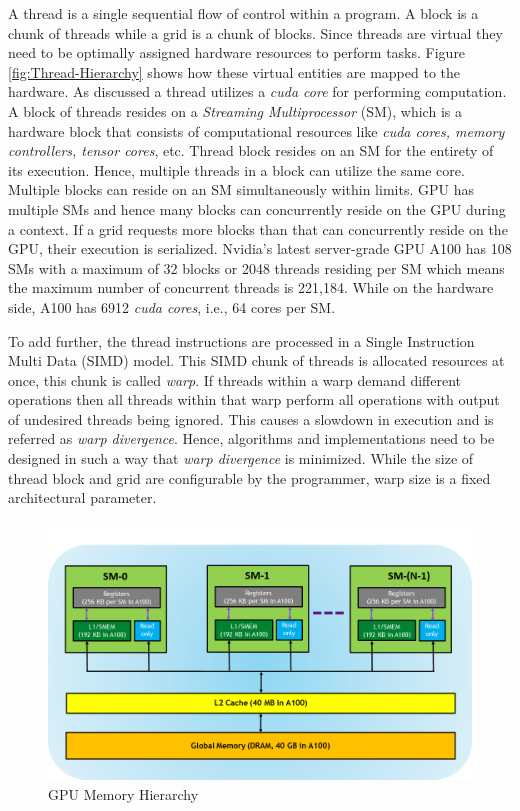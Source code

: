 A thread is a single sequential flow of control within a program.
A block is a chunk of threads while a grid is a chunk of blocks.
Since threads are virtual they need to be optimally assigned hardware resources to perform tasks.
Figure \ref{fig:Thread-Hierarchy} shows how these virtual entities are mapped to the hardware. As discussed a thread utilizes a \textit{cuda core} for performing computation. A block of threads resides on a \textit{Streaming Multiprocessor} (SM), which is a hardware block that consists of computational resources like \textit{cuda cores, memory controllers, tensor cores}, etc. Thread block resides on an SM for the entirety of its execution. Hence, multiple threads in a block can utilize the same core. Multiple blocks can reside on an SM simultaneously within limits.
GPU has multiple SMs and hence many blocks can concurrently reside on the GPU during a context. If a grid requests more blocks than that can concurrently reside on the GPU, their execution is serialized.
Nvidia's latest server-grade GPU A100 has 108 SMs with a maximum of 32 blocks or 2048 threads residing per SM which means the maximum number of concurrent threads is  221,184. While on the hardware side, A100 has 6912 \textit{cuda cores}, i.e., 64 cores per SM.

To add further, the thread instructions are processed in a Single Instruction Multi Data (SIMD) model. This SIMD chunk of threads is allocated resources at once, this chunk is called \textit{warp}. If threads within a warp demand different operations then all threads within that warp perform all operations with output of undesired threads being ignored. This causes a slowdown in execution and is referred as \textit{warp divergence}. Hence, algorithms and implementations need to be designed in such a way that \textit{warp divergence} is minimized. While the size of thread block and grid are configurable by the programmer, warp size is a fixed architectural parameter.

\begin{figure}[h]
    \includegraphics[width=\textwidth]{fig/memory-hierarchy.png}
    \caption{GPU Memory Hierarchy}
    \label{fig:Memory-Hierarchy}
\end{figure}

